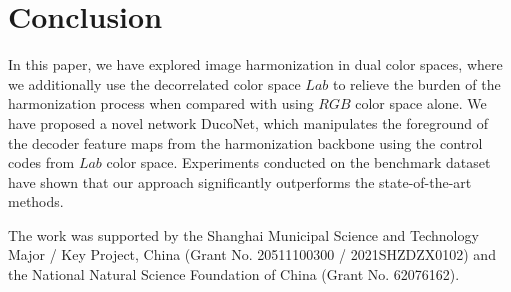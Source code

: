 \documentclass[sigconf]{acmart}
\begin{document}
\section{Conclusion}
In this paper, we have explored image harmonization in dual color spaces, where we additionally use the decorrelated color space $Lab$ to relieve the burden of the harmonization process when compared with using $RGB$ color space alone.
We have proposed a novel network DucoNet, which manipulates the foreground of the decoder feature maps from the harmonization backbone using the control codes from $Lab$ color space. Experiments conducted on the benchmark dataset have shown that our approach significantly outperforms the state-of-the-art methods.

\begin{acks}
 The work was supported by the Shanghai Municipal Science and Technology Major / Key Project, China (Grant No. 20511100300 / 2021SHZDZX0102) and the National Natural Science Foundation of China (Grant No. 62076162).
\end{acks}



\end{document}
